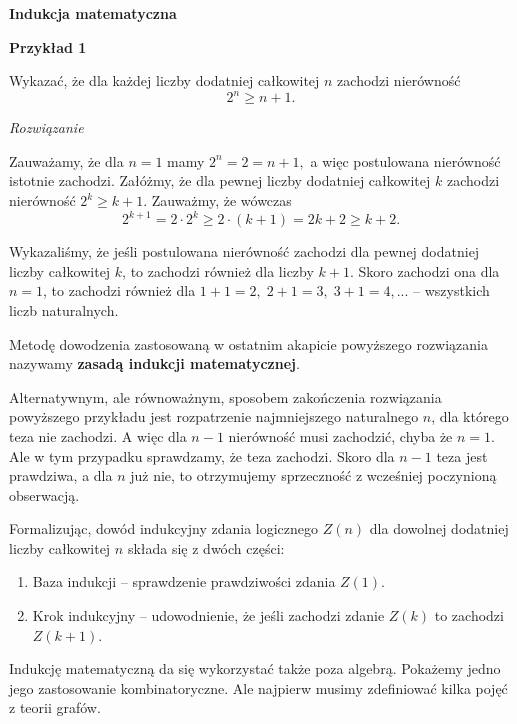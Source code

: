 
\begin{center}
	\textbf{Indukcja matematyczna}
\end{center}

\noindent
\textbf{Przykład 1}

\noindent
Wykazać, że dla każdej liczby dodatniej całkowitej $n$ zachodzi nierówność
\[
	2^n \geqslant n + 1.
\]

\noindent
\textit{Rozwiązanie}

\noindent
Zauważamy, że dla $n = 1$ mamy $2^n = 2 = n + 1,$ a więc postulowana nierówność istotnie zachodzi.
Załóżmy, że dla pewnej liczby dodatniej całkowitej $k$ zachodzi nierówność $2^k \geqslant k + 1$. Zauważmy, że wówczas
\[
	2^{k + 1} = 2 \cdot 2^k \geqslant 2 \cdot (k + 1) = 2k + 2 \geqslant k + 2.
\]

Wykazaliśmy, że jeśli postulowana nierówność zachodzi dla pewnej dodatniej liczby całkowitej $k$, to zachodzi również dla liczby $k + 1$. Skoro zachodzi ona dla $n = 1$, to zachodzi również dla $1 + 1 = 2,\; 2 + 1 = 3,\; 3 + 1 = 4, ...$ -- wszystkich liczb naturalnych.

\vspace{20px}

\noindent
Metodę dowodzenia zastosowaną w ostatnim akapicie powyższego rozwiązania nazywamy \textbf{zasadą indukcji matematycznej}.

Alternatywnym, ale równoważnym, sposobem zakończenia rozwiązania powyższego przykładu jest rozpatrzenie najmniejszego naturalnego $n$, dla którego teza nie zachodzi. A więc dla $n - 1$ nierówność musi zachodzić, chyba że $n = 1$. Ale w tym przypadku sprawdzamy, że teza zachodzi. Skoro dla $n - 1$ teza jest prawdziwa, a dla $n$ już nie, to otrzymujemy sprzeczność z wcześniej poczynioną obserwacją.


\vspace{10px}

Formalizując, dowód indukcyjny zdania logicznego $Z(n)$ dla dowolnej dodatniej liczby całkowitej $n$ składa się z dwóch części:
\begin{enumerate}
	\item Baza indukcji -- sprawdzenie prawdziwości zdania $Z(1)$.
	\item Krok indukcyjny -- udowodnienie, że jeśli zachodzi zdanie $Z(k)$ to zachodzi $Z(k + 1)$.
\end{enumerate}

Indukcję matematyczną da się wykorzystać także poza algebrą. Pokażemy jedno jego zastosowanie kombinatoryczne. Ale najpierw musimy zdefiniować kilka pojęć z teorii grafów.

